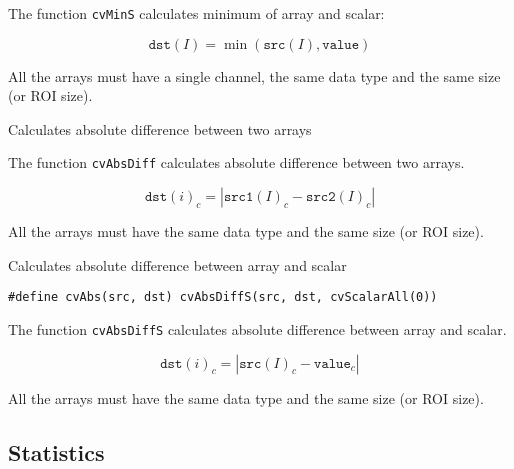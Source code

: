 The function \texttt{cvMinS} calculates minimum of array and scalar:

\[
\texttt{dst}(I)=\min(\texttt{src}(I), \texttt{value})
\]

All the arrays must have a single channel, the same data type and the same size (or ROI size).


Calculates absolute difference between two arrays


\begin{description}
\end{description}

The function \texttt{cvAbsDiff} calculates absolute difference between two arrays.

\[ \texttt{dst}(i)_c = |\texttt{src1}(I)_c - \texttt{src2}(I)_c| \]

All the arrays must have the same data type and the same size (or ROI size).


Calculates absolute difference between array and scalar


\begin{lstlisting}
#define cvAbs(src, dst) cvAbsDiffS(src, dst, cvScalarAll(0))
\end{lstlisting}

\begin{description}
\end{description}

The function \texttt{cvAbsDiffS} calculates absolute difference between array and scalar.

\[ \texttt{dst}(i)_c = |\texttt{src}(I)_c - \texttt{value}_c| \]

All the arrays must have the same data type and the same size (or ROI size).

\subsection{Statistics}

